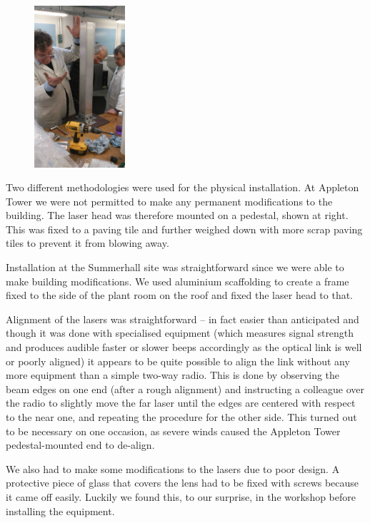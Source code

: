 \documentclass{amsart}
\begin{document}
\begin{figure}
  \includegraphics[angle=-90,width=0.3\textwidth]{tada-s}
\end{figure}
Two different methodologies were used for the physical
installation. At Appleton Tower we were not permitted to make any
permanent modifications to the building. The laser head was therefore
mounted on a pedestal, shown at right. This was fixed to a paving tile
and further weighed down with more scrap paving tiles to prevent it
from blowing away.

Installation at the Summerhall site was straightforward since we were
able to make building modifications. We used aluminium scaffolding to
create a frame fixed to the side of the plant room on the roof and
fixed the laser head to that.

Alignment of the lasers was straightforward -- in fact easier than
anticipated and though it was done with specialised equipment (which
measures signal strength and produces audible faster or slower beeps
accordingly as the optical link is well or poorly aligned) it appears
to be quite possible to align the link without any more equipment than
a simple two-way radio. This is done by observing the beam edges on
one end (after a rough alignment) and instructing a colleague over the
radio to slightly move the far laser until the edges are centered with
respect to the near one, and repeating the procedure for the other
side. This turned out to be necessary on one occasion, as severe winds caused the
Appleton Tower pedestal-mounted end to de-align.

We also had to make some modifications to the lasers due to poor
design. A protective piece of glass that covers the lens had to be
fixed with screws because it came off easily. Luckily we found this,
to our surprise, in the workshop before installing the equipment.
\end{document}
